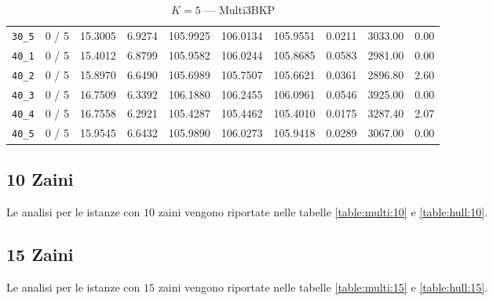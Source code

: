 \begin{table}[h!]
\begin{center}
\begin{tabular}{| c | c | c | c | c | c | c | c | c | c |}
\verb|30_5| & 0 / 5 & 15.3005 & 6.9274 & 105.9925 & 106.0134 & 105.9551 & 0.0211 & 3033.00 & 0.00\\ 
\verb|40_1| & 0 / 5 & 15.4012 & 6.8799 & 105.9582 & 106.0244 & 105.8685 & 0.0583 & 2981.00 & 0.00\\ 
\verb|40_2| & 0 / 5 & 15.8970 & 6.6490 & 105.6989 & 105.7507 & 105.6621 & 0.0361 & 2896.80 & 2.60\\ 
\verb|40_3| & 0 / 5 & 16.7509 & 6.3392 & 106.1880 & 106.2455 & 106.0961 & 0.0546 & 3925.00 & 0.00\\ 
\verb|40_4| & 0 / 5 & 16.7558 & 6.2921 & 105.4287 & 105.4462 & 105.4010 & 0.0175 & 3287.40 & 2.07\\ 
\verb|40_5| & 0 / 5 & 15.9545 & 6.6432 & 105.9890 & 106.0273 & 105.9418 & 0.0289 & 3067.00 & 0.00\\ 
\hline
\end{tabular}
\caption{$K = 5$ --- Multi3BKP}
\label{table:multi:5}
\end{center}
\end{table}

\subsection{10 Zaini}
Le analisi per le istanze con $10$ zaini vengono riportate nelle tabelle
\ref{table:multi:10} e \ref{table:hull:10}.



\subsection{15 Zaini}

Le analisi per le istanze con $15$ zaini vengono riportate nelle tabelle
\ref{table:multi:15} e \ref{table:hull:15}.


